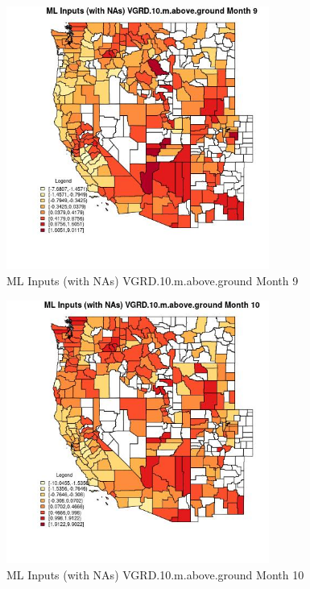 \clearpage 

\begin{figure} 
\centering  
\includegraphics[width=0.77\textwidth]{Code_Outputs/Report_ML_input_PM25_Step4_part_e_de_duplicated_aves_compiled_2019-05-21wNAs_CountyVGRD10mabovegroundmedianMonth9.jpg} 
\caption{\label{fig:Report_ML_input_PM25_Step4_part_e_de_duplicated_aves_compiled_2019-05-21wNAsCountyVGRD10mabovegroundmedianMonth9}ML Inputs (with NAs) VGRD.10.m.above.ground Month 9} 
\end{figure} 
 

\begin{figure} 
\centering  
\includegraphics[width=0.77\textwidth]{Code_Outputs/Report_ML_input_PM25_Step4_part_e_de_duplicated_aves_compiled_2019-05-21wNAs_CountyVGRD10mabovegroundmedianMonth10.jpg} 
\caption{\label{fig:Report_ML_input_PM25_Step4_part_e_de_duplicated_aves_compiled_2019-05-21wNAsCountyVGRD10mabovegroundmedianMonth10}ML Inputs (with NAs) VGRD.10.m.above.ground Month 10} 
\end{figure} 
 


